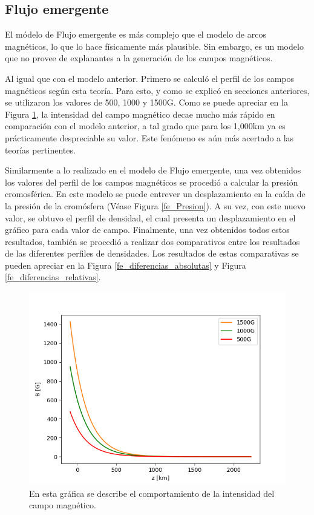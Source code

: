 \documentclass[9pt]{book}
\begin{document}
\clearpage
\subsection{Flujo emergente}
El m\'odelo de Flujo emergente es m\'as complejo que el modelo de arcos magn\'eticos, lo que lo hace f\'isicamente m\'as plausible. Sin embargo, es un modelo que no provee de explanantes a la generaci\'on de los campos magn\'eticos.

Al igual que con el modelo anterior. Primero se calcul\'o el perfil de los campos magn\'eticos seg\'un esta teor\'ia. Para esto, y como se explic\'o en secciones anteriores, se utilizaron los valores de 500, 1000 y 1500G. Como se puede apreciar en la Figura \ref{fe_Campo_Magnetico}, la intensidad del campo magn\'etico decae mucho m\'as r\'apido en comparaci\'on con el modelo anterior, a tal grado que para los 1,000km ya es pr\'acticamente despreciable su valor. Este fen\'omeno es a\'un m\'as acertado a las teor\'ias pertinentes.

Similarmente a lo realizado en el modelo de Flujo emergente, una vez obtenidos los valores del perfil de los campos magn\'eticos se procedi\'o a calcular la presi\'on cromosf\'erica. En este modelo se puede entrever un desplazamiento en la ca\'ida de la presi\'on de la crom\'osfera (V\'ease Figura \ref{fe_Presion}). A su vez, con este nuevo valor, se obtuvo el perfil de densidad, el cual presenta un desplazamiento en el gr\'afico para cada valor de campo. 
Finalmente, una vez obtenidos todos estos resultados, tambi\'en se procedi\'o a realizar dos comparativos entre los resultados de las diferentes perfiles de densidades. Los resultados de estas comparativas se pueden apreciar en la Figura \ref{fe_diferencias_absolutas} y Figura \ref{fe_diferencias_relativas}.

\begin{figure}[h]
\centering
\includegraphics[scale=1]{fe_Campo_Magnetico}
\caption{ En esta gr\'afica se describe el comportamiento de la intensidad del campo magn\'etico. }
\label{fe_Campo_Magnetico}
\end{figure}
\end{document}
